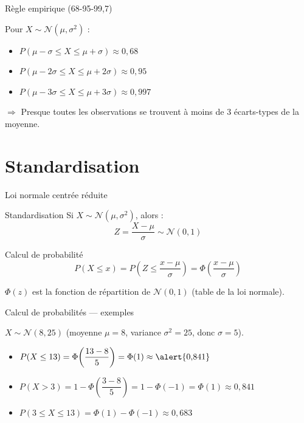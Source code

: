\documentclass{BeamerTemplate}
\begin{document}
\begin{frame}[t]{Règle empirique (68-95-99,7)}

Pour $X \sim \mathcal{N}(\mu, \sigma^2)$ :

\bigskip
\begin{itemize}\itemsep6mm
  \item $P(\mu - \sigma \le X \le \mu + \sigma) \approx 0{,}68$
  \item $P(\mu - 2\sigma \le X \le \mu + 2\sigma) \approx 0{,}95$
  \item $P(\mu - 3\sigma \le X \le \mu + 3\sigma) \approx 0{,}997$
\end{itemize}

\bigskip
$\Rightarrow$ Presque toutes les observations se trouvent à moins de 3 écarts-types de la moyenne.

\end{frame}

\section{Standardisation}

\begin{frame}[t]{Loi normale centrée réduite}

\begin{Boite}{Standardisation}
Si $X \sim \mathcal{N}(\mu, \sigma^2)$, alors :
$$Z = \frac{X - \mu}{\sigma} \sim \mathcal{N}(0, 1)$$
\end{Boite}

\begin{Boite}{Calcul de probabilité}
$$P(X \le x) = P\!\left(Z \le \frac{x-\mu}{\sigma}\right) = \Phi\!\left(\frac{x-\mu}{\sigma}\right)$$
\end{Boite}

\medskip
$\Phi(z)$ est la fonction de répartition de $\mathcal{N}(0,1)$ (table de la loi normale).

\end{frame}

\begin{frame}[t]{Calcul de probabilités — exemples}

$X \sim \mathcal{N}(8, 25)$ (moyenne $\mu = 8$, variance $\sigma^2 = 25$, donc $\sigma = 5$).

\bigskip
\begin{itemize}\itemsep6mm
  \item $P(X \le 13) = \Phi\!\left(\dfrac{13-8}{5}\right) = \Phi(1) \approx \alert{0{,}841}$
  \item $P(X > 3) = 1 - \Phi\!\left(\dfrac{3-8}{5}\right) = 1 - \Phi(-1) = \Phi(1) \approx 0{,}841$
  \item $P(3 \le X \le 13) = \Phi(1) - \Phi(-1) \approx 0{,}683$
\end{itemize}

\end{frame}
\end{document}
